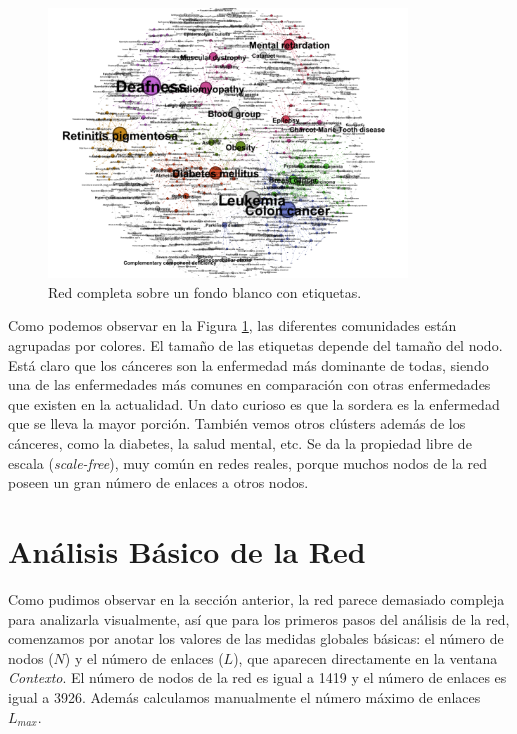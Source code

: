 \documentclass{uimppracticas}
\begin{document}
\begin{figure}[H]
	\centering
	\includegraphics[width=0.85\textwidth]{images/completa_FR_labels}
	\caption{Red completa sobre un fondo blanco con etiquetas.}
	\label{completa_FR_labels}
\end{figure}

Como podemos observar en la Figura \ref{completa_FR_labels}, las diferentes comunidades están agrupadas por colores. El tamaño de las etiquetas depende del tamaño del nodo. Está claro que los cánceres son la enfermedad más dominante de todas, siendo una de las enfermedades más comunes en comparación con otras enfermedades que existen en la actualidad. Un dato curioso es que la sordera es la enfermedad que se lleva la mayor porción. También vemos otros clústers además de los cánceres, como la diabetes, la salud mental, etc. Se da la propiedad libre de escala (\textit{scale-free}), muy común en redes reales, porque muchos nodos de la red poseen un gran número de enlaces a otros nodos.

\section*{Análisis Básico de la Red}

Como pudimos observar en la sección anterior, la red parece demasiado compleja para analizarla visualmente, así que para los primeros pasos del análisis de la red, comenzamos por anotar los valores de las medidas globales básicas: el número de nodos ($N$) y el número de enlaces ($L$), que aparecen directamente en la ventana \textit{Contexto}. El número de nodos de la red es igual a 1419 y el número de enlaces es igual a 3926. Además calculamos manualmente el número máximo de enlaces $L_{max}$.
\end{document}
